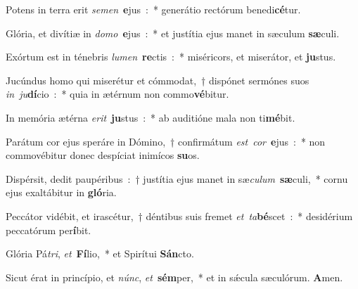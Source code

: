 ﻿\item Potens in terra erit \emph{se}\-\emph{men}\ \textbf{e}\-jus~:~* generátio rectórum benedi\textbf{cé}tur.
\item Glória, et divítiæ in \emph{do}\-\emph{mo}\ \textbf{e}\-jus~:~* et justítia ejus manet in sæculum \textbf{sæ}culi.
\item Exórtum est in ténebris \emph{lu}\-\emph{men}\ \textbf{re}\-ctis~:~* miséricors, et miserátor, et \textbf{ju}stus.
\item Jucúndus homo qui miserétur et cómmodat,~† dispónet sermónes suos \emph{in}\ \emph{ju}\-\textbf{dí}\-cio~:~* quia in ætérnum non commo\textbf{vé}bitur.
\item In memória ætérna \emph{e}\-\emph{rit}\ \textbf{ju}\-stus~:~* ab auditióne mala non ti\textbf{mé}bit.
\item Parátum cor ejus speráre in Dómino,~† confirmátum \emph{est}\ \emph{cor}\ \textbf{e}\-jus~:~* non commovébitur donec despíciat inimícos \textbf{su}os.
\item Dispérsit, dedit pau\-pé\-ri\-bus~:~† justítia ejus manet in sæ\emph{cu}\-\emph{lum}\ \textbf{sæ}\-culi,~* cornu ejus exaltábitur in \textbf{gló}ria.
\item Peccátor vidébit, et irascétur,~† déntibus suis fremet \emph{et}\ \emph{ta}\-\textbf{bé}\-scet~:~* desidérium peccatórum per\textbf{í}bit.
\item Glória Pá\emph{tri}, \emph{et}\ \textbf{Fí}\-lio,~* et Spirítui \textbf{Sán}cto.
\item Sicut érat in princípio, et \emph{núnc}, \emph{et}\ \textbf{sém}\-per,~* et in sǽcula sæculórum. \textbf{A}men.